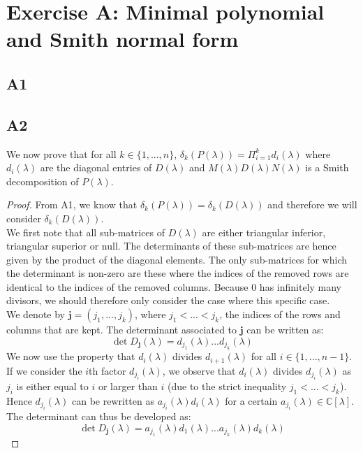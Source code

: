 \documentclass[11pt]{article}
\DeclareMathOperator{\det}{det}
\newcommand{\complex}{\mathbb{C}} %
\begin{document}
\section*{Exercise A: Minimal polynomial and Smith normal form}
\subsection*{A1}

\subsection*{A2}
We now prove that for all $k\in\{1,...,n\}$, $\delta_k(P(\lambda))=\Pi^k_{i=1}d_i(\lambda)$ where $d_i(\lambda)$ are the diagonal entries of $D(\lambda)$ and $M(\lambda)D(\lambda)N(\lambda)$ is a Smith decomposition of $P(\lambda)$.
\begin{proof}
From A1, we know that $\delta_k(P(\lambda))=\delta_k(D(\lambda))$ and therefore we will consider $\delta_k(D(\lambda))$.\\
We first note that all sub-matrices of $D(\lambda)$ are either triangular inferior, triangular superior or null. The determinants of these sub-matrices are hence given by the product of the diagonal elements. The only sub-matrices for which the determinant is non-zero are these where the indices of the removed rows are identical to the indices of the removed columns. Because 0 has infinitely many divisors, we should therefore only consider the case where this specific case.\\
We denote by $\textbf{j}=(j_1,...,j_k)$, where $j_1<...<j_k$, the indices of the rows and columns that are kept. The determinant associated to $\textbf{j}$ can be written as:
\begin{equation*}
    \det D_{\textbf{j}}(\lambda)=d_{j_1}(\lambda)...d_{j_k}(\lambda)
\end{equation*}
We now use the property that $d_i(\lambda)$ divides $d_{i+1}(\lambda)$ for all $i\in\{1,...,n-1\}$.\\
If we consider the $i$th factor $d_{j_i}(\lambda)$, we observe that $d_i(\lambda)$ divides $d_{j_i}(\lambda)$ as $j_i$ is either equal to $i$ or larger than $i$ (due to the strict inequality $j_1<...<j_k$). Hence $d_{j_i}(\lambda)$ can be rewritten as $a_{j_i}(\lambda)d_i(\lambda)$ for a certain $a_{j_i}(\lambda)\in\complex[\lambda]$. The determinant can thus be developed as:
\begin{equation}\label{detDj}
    \det D_{\textbf{j}}(\lambda)=a_{j_1}(\lambda) d_1(\lambda)...a_{j_k}(\lambda)d_{k}(\lambda)

\end{equation}
\end{proof}
\end{document}

